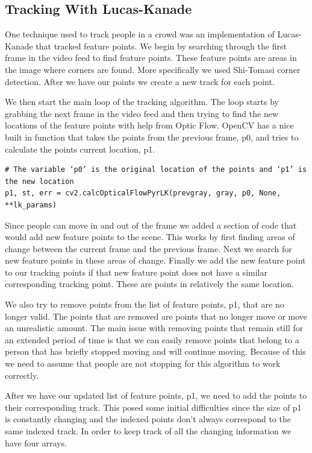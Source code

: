 \documentclass[12pt, twocolumn, conference]{IEEEtran}
\begin{document}
\subsection{Tracking With Lucas-Kanade}

One technique used to track people in a crowd was an implementation of Lucas-Kanade that tracked feature points. We begin by searching through the first frame in the video feed to find feature points. These feature points are areas in the image where corners are found. More specifically we used Shi-Tomasi corner detection. After we have our points we create a new track for each point.

We then start the main loop of the tracking algorithm. The loop starts by grabbing the next frame in the video feed and then trying to find the new locations of the feature points with help from Optic Flow. OpenCV has a nice built in function that takes the points from the previous frame, p0, and tries to calculate the points current location, p1.

\begin{lstlisting}
# The variable ‘p0’ is the original location of the points and ‘p1’ is the new location
p1, st, err = cv2.calcOpticalFlowPyrLK(prevgray, gray, p0, None, **lk_params)
\end{lstlisting}

Since people can move in and out of the frame we added a section of code that would add new feature points to the scene. This works by first finding areas of change between the current frame and the previous frame. Next we search for new feature points in these areas of change. Finally we add the new feature point to our tracking points if that new feature point does not have a similar corresponding tracking point. These are points in relatively the same location.

We also try to remove points from the list of feature points, p1, that are no longer valid. The points that are removed are points that no longer move or move an unrealistic amount. The main issue with removing points that remain still for an extended period of time is that we can easily remove points that belong to a person that has briefly stopped moving and will continue moving. Because of this we need to assume that people are not stopping for this algorithm to work correctly.

After we have our updated list of feature points, p1, we need to add the points to their corresponding track. This posed some initial difficulties since the size of p1 is constantly changing and the indexed points don’t always correspond to the same indexed track. In order to keep track of all the changing information we have four arrays.
\end{document}
